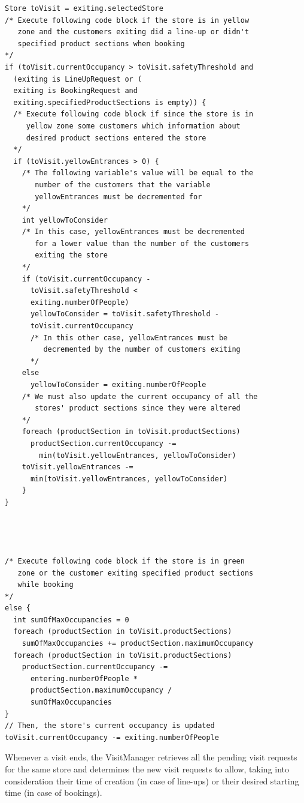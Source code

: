 \documentclass[a4paper,oneside,11pt]{book}
\begin{document}
    \begin{lstlisting}[language=pseudocodeDD]
Store toVisit = exiting.selectedStore
/* Execute following code block if the store is in yellow 
   zone and the customers exiting did a line-up or didn't 
   specified product sections when booking
*/
if (toVisit.currentOccupancy > toVisit.safetyThreshold and 
  (exiting is LineUpRequest or (
  exiting is BookingRequest and 
  exiting.specifiedProductSections is empty)) {
  /* Execute following code block if since the store is in 
     yellow zone some customers which information about 
     desired product sections entered the store
  */
  if (toVisit.yellowEntrances > 0) {
    /* The following variable's value will be equal to the 
       number of the customers that the variable 
       yellowEntrances must be decremented for
    */
    int yellowToConsider
    /* In this case, yellowEntrances must be decremented 
       for a lower value than the number of the customers 
       exiting the store
    */
    if (toVisit.currentOccupancy - 
      toVisit.safetyThreshold < 
      exiting.numberOfPeople)
      yellowToConsider = toVisit.safetyThreshold - 
      toVisit.currentOccupancy
      /* In this other case, yellowEntrances must be 
         decremented by the number of customers exiting
      */
    else 
      yellowToConsider = exiting.numberOfPeople
    /* We must also update the current occupancy of all the
       stores' product sections since they were altered
    */
    foreach (productSection in toVisit.productSections)
      productSection.currentOccupancy -=
        min(toVisit.yellowEntrances, yellowToConsider)
    toVisit.yellowEntrances -= 
      min(toVisit.yellowEntrances, yellowToConsider) 
    }
}




/* Execute following code block if the store is in green 
   zone or the customer exiting specified product sections 
   while booking
*/
else {
  int sumOfMaxOccupancies = 0
  foreach (productSection in toVisit.productSections)
    sumOfMaxOccupancies += productSection.maximumOccupancy
  foreach (productSection in toVisit.productSections)
    productSection.currentOccupancy -= 
      entering.numberOfPeople * 
      productSection.maximumOccupancy / 
      sumOfMaxOccupancies
}
// Then, the store's current occupancy is updated
toVisit.currentOccupancy -= exiting.numberOfPeople
\end{lstlisting}
    Whenever a visit ends, the VisitManager retrieves all the pending visit requests for the same store and determines the new visit requests to allow, taking into consideration their time of creation (in case of line-ups) or their desired starting time (in case of bookings).
    \newpage
\end{document}
